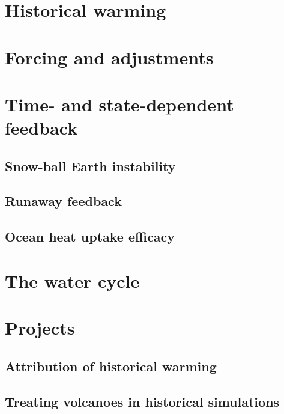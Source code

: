 \documentclass[12pt]{book}
\begin{document}
\chapter{Historical warming}

\chapter{Forcing and adjustments}

\chapter{Time- and state-dependent feedback}
\section{Snow-ball Earth instability}
\section{Runaway feedback}
\section{Ocean heat uptake efficacy}

\chapter{The water cycle}


\chapter{Projects}


\section{Attribution of historical warming}


\section{Treating volcanoes in historical simulations}
\end{document}
